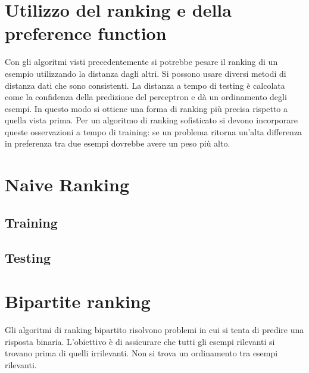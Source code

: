 \section{Utilizzo del ranking e della preference function}
Con gli algoritmi visti precedentemente si potrebbe pesare il ranking di un esempio utilizzando la distanza dagli altri.
Si possono usare diversi metodi di distanza dati che sono consistenti.
La distanza a tempo di testing \`e calcolata come la confidenza della predizione del perceptron e d\`a un ordinamento degli esempi.
In questo modo si ottiene una forma di ranking pi\`u precisa rispetto a quella vista prima.
Per un algoritmo di ranking sofisticato si devono incorporare queste osservazioni a tempo di training: se un problema ritorna un'alta differenza in preferenza tra due esempi dovrebbe avere un peso pi\`u alto.

\section{Naive Ranking}

	\subsection{Training}
	

	\subsection{Testing}
	

\section{Bipartite ranking}
Gli algoritmi di ranking bipartito risolvono problemi in cui si tenta di predire una risposta binaria.
L'obiettivo \`e di assicurare che tutti gli esempi rilevanti si trovano prima di quelli irrilevanti.
Non si trova un ordinamento tra esempi rilevanti.


